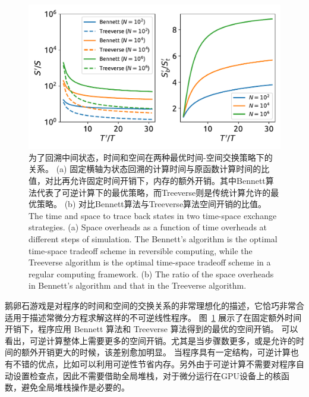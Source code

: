 \documentclass[A4,twoside,UTF8]{ctexart}
\begin{document}
\begin{figure}[h]
\centering
\includegraphics[width=0.8\columnwidth]{./fig1.pdf}
    \caption{为了回溯中间状态，时间和空间在两种最优时间-空间交换策略下的关系。
    (a) 固定横轴为状态回溯的计算时间与原函数计算时间的比值，对比再允许固定时间开销下，内存的额外开销。其中Bennett算法代表了可逆计算下的最优策略，而Treeverse则是传统计算允许的最优策略。
    (b) 对比Bennett算法与Treeverse算法空间开销的比值。\\
    The time and space to trace back states in two time-space exchange strategies.
    (a) Space overheads as a function of time overheads at different steps of simulation.
    The Bennett's algorithm is the optimal time-space tradeoff scheme in reversible computing, while the Treeverse algorithm is the optimal time-space tradeoff scheme in a regular computing framework.
    (b) The ratio of the space overheads in Bennett's algorithm and that in the Treeverse algorithm.
    }\label{fig:timespace}
\end{figure}

鹅卵石游戏是对程序的时间和空间的交换关系的非常理想化的描述，它恰巧非常合适用于描述常微分方程求解这样的不可逆线性程序。
图~\ref{fig:timespace} 展示了在固定额外时间开销下，程序应用 Bennett 算法和 Treeverse 算法得到的最优的空间开销。
可以看出，可逆计算整体上需要更多的空间开销。尤其是当步骤数更多，或是允许的时间的额外开销更大的时候，该差别愈加明显。
当程序具有一定结构，可逆计算也有不错的优点，比如可以利用可逆性节省内存。另外由于可逆计算不需要对程序自动设置检查点，因此不需要借助全局堆栈，对于微分运行在GPU设备上的核函数，避免全局堆栈操作是必要的。


%
%
%
%
%
\end{document}
